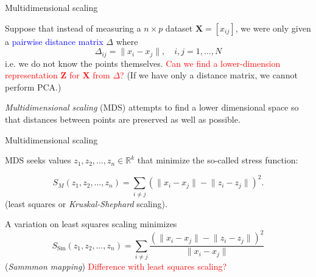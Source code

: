 \documentclass[14pt]{beamer}
\begin{document}
\begin{frame}{Multidimensional scaling}

Suppose that instead of measuring a $n \times p$ dataset $\bm{X} = [x_{ij}]$, we were only given a \textcolor{blue}{pairwise distance matrix} $\Delta$ where
$$ \Delta_{ij} = \lVert x_i - x_j \rVert, \quad i, j = 1, \dots, N$$
i.e. we do not know  the points themselves. \textcolor{red}{Can we find a lower-dimension representation $\bm{Z}$ for $\bm{X}$ from $\Delta$?} (If we have only a distance matrix, we cannot perform PCA.)

\pause

\emph{Multidimensional scaling} (MDS) attempts to find a lower dimensional space so that distances between points are preserved as well as possible. 

\end{frame}

\begin{frame}{Multidimensional scaling}

MDS seeks values $z_1, z_2, \dots, z_n \in \mathbb{R}^k$ that minimize the so-called stress function:

$$ S_M(z_1, z_2, \dots, z_n) = \sum_{i \neq j} (\lVert x_i - x_j \rVert - \lVert z_i - z_j \rVert)^2. $$
(least squares or \emph{Kruskal-Shephard} scaling).

A variation on least squares scaling minimizes
$$ S_{\text{Sm}}(z_1, z_2, \dots, z_n) = \sum_{i \neq j} \frac{(\lVert x_i - x_j \rVert - \lVert z_i - z_j \rVert)^2}{\lVert x_i - x_j \rVert} $$
(\emph{Sammmon mapping}) \textcolor{red}{Difference with least squares scaling?}

\end{frame}


\end{document}
